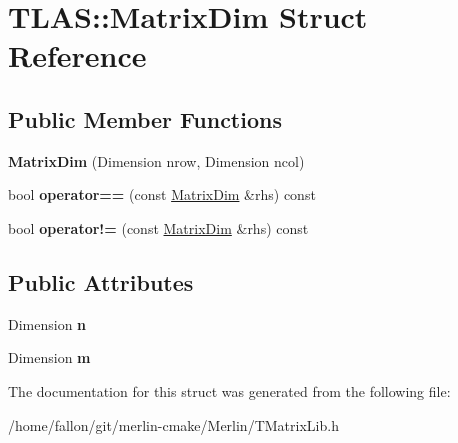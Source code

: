 \hypertarget{structTLAS_1_1MatrixDim}{}\section{T\+L\+AS\+:\+:Matrix\+Dim Struct Reference}
\label{structTLAS_1_1MatrixDim}
\subsection*{Public Member Functions}
\begin{DoxyCompactItemize}
\item 
\mbox{\label{structTLAS_1_1MatrixDim_acf05201717c296b6f01cc418184e9c7b}} 
{\bfseries Matrix\+Dim} (Dimension nrow, Dimension ncol)
\item 
\mbox{\label{structTLAS_1_1MatrixDim_ad66a343176a6de9a126b8b94d8ee4a0c}} 
bool {\bfseries operator==} (const \hyperlink{structTLAS_1_1MatrixDim}{Matrix\+Dim} \&rhs) const
\item 
\mbox{\label{structTLAS_1_1MatrixDim_a474846c8978769a05090f1a076d476cd}} 
bool {\bfseries operator!=} (const \hyperlink{structTLAS_1_1MatrixDim}{Matrix\+Dim} \&rhs) const
\end{DoxyCompactItemize}
\subsection*{Public Attributes}
\begin{DoxyCompactItemize}
\item 
\mbox{\label{structTLAS_1_1MatrixDim_a60db406fdd756ede1af138e76d95728b}} 
Dimension {\bfseries n}
\item 
\mbox{\label{structTLAS_1_1MatrixDim_a4aeb4c75dcb47242de89975f8bf42a55}} 
Dimension {\bfseries m}
\end{DoxyCompactItemize}


The documentation for this struct was generated from the following file\+:\begin{DoxyCompactItemize}
\item 
/home/fallon/git/merlin-\/cmake/\+Merlin/T\+Matrix\+Lib.\+h\end{DoxyCompactItemize}
